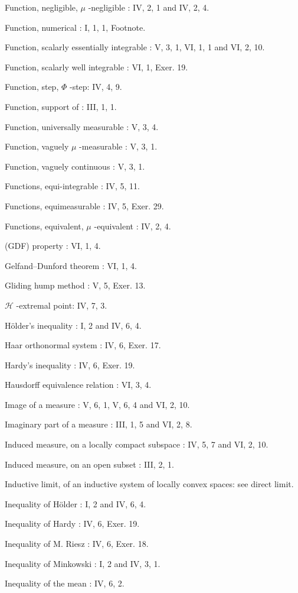 Function, negligible, \(\mu\) -negligible : IV, 2, 1 and IV, 2, 4.

Function, numerical : I, 1, 1, Footnote.

Function, scalarly essentially integrable : V, 3, 1, VI, 1, 1 and VI, 2, 10.

Function, scalarly well integrable : VI, 1, Exer. 19.

Function, step, \(\Phi\) -step: IV, 4, 9.

Function, support of : III, 1, 1.

Function, universally measurable : V, 3, 4.

Function, vaguely \(\mu\) -measurable : V, 3, 1.

Function, vaguely continuous : V, 3, 1.

Functions, equi-integrable : IV, 5, 11.

Functions, equimeasurable : IV, 5, Exer. 29.

Functions, equivalent, \(\mu\) -equivalent : IV, 2, 4.

(GDF) property : VI, 1, 4.

Gelfand--Dunford theorem : VI, 1, 4.

Gliding hump method : V, 5, Exer. 13.

\(\mathcal{H}\) -extremal point: IV, 7, 3.

Hölder's inequality : I, 2 and IV, 6, 4.

Haar orthonormal system : IV, 6, Exer. 17.

Hardy's inequality : IV, 6, Exer. 19.

Hausdorff equivalence relation : VI, 3, 4.

Image of a measure : V, 6, 1, V, 6, 4 and VI, 2, 10.

Imaginary part of a measure : III, 1, 5 and VI, 2, 8.

Induced measure, on a locally compact subspace : IV, 5, 7 and VI, 2, 10.

Induced measure, on an open subset : III, 2, 1.

Inductive limit, of an inductive system of locally convex spaces: see direct limit.

Inequality of Hölder : I, 2 and IV, 6, 4.

Inequality of Hardy : IV, 6, Exer. 19.

Inequality of M. Riesz : IV, 6, Exer. 18.

Inequality of Minkowski : I, 2 and IV, 3, 1.

Inequality of the mean : IV, 6, 2.


